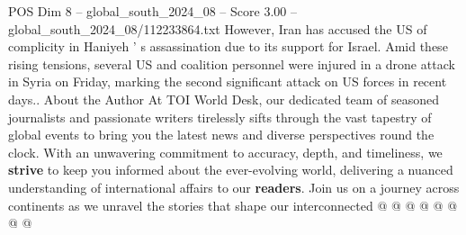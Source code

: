 \begin{textsample}{POS Dim 8 – global\_south\_2024\_08 – Score 3.00 – global\_south\_2024\_08/112233864.txt}
However, Iran has accused the US of complicity in Haniyeh ' s assassination due to its support for Israel.
Amid these rising tensions, several US and coalition personnel were injured in a drone attack in Syria on Friday, marking the second significant attack on US forces in recent days..
About the Author At TOI World Desk, our dedicated team of seasoned journalists and passionate writers tirelessly sifts through the vast tapestry of global events to bring you the latest news and diverse perspectives round the clock.
With an unwavering commitment to accuracy, depth, and timeliness, we \textbf{strive} to keep you informed about the ever-evolving world, delivering a nuanced understanding of international affairs to our \textbf{readers}.
Join us on a journey across continents as we unravel the stories that shape our interconnected @ @ @ @ @ @ @ @

\end{textsample}
